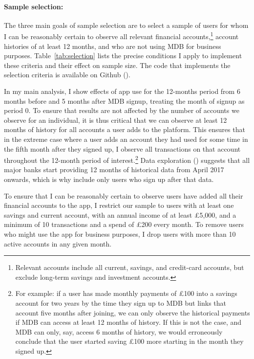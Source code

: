 \paragraph{Sample selection:}%
\label{par:sample_selection_}

The three main goals of sample selection are to select a sample of users for whom I
can be reasonably certain to observe all relevant financial
accounts,\footnote{Relevant accounts include all current, savings, and
credit-card accounts, but exclude long-term savings and investment accounts.}
account histories of at least 12 months, and who are not using MDB for business
purposes. Table~\ref{tab:selection} lists the precise conditions I apply to implement
these criteria and their effect on sample size. The code that implements the
selection criteria is available on Github
(\href{https://github.com/fabiangunzinger/mdb_eval/blob/main/src/data/selectors.py}{\faGithub}).

In my main analysis, I show effects of app use for the 12-months period from 6
months before and 5 months after MDB signup, treating the month of signup as
period 0. To ensure that results are not affected by the number of accounts we
observe for an individual, it is thus critical that we can observe at least 12
months of history for all accounts a user adds to the platform. This ensures
that in the extreme case where a user adds an account they had used for some
time in the fifth month after they signed up, I observe all transactions on
that account throughout the 12-month period of interest.\footnote{For example:
    if a user has made monthly payments of \pounds100 into a savings account
    for two years by the time they sign up to MDB but links that account five
    months after joining, we can only observe the historical payments if MDB
    can access at least 12 months of history. If this is not the case, and MDB
    can only, say, access 6 months of history, we would erroneously conclude
that the user started saving \pounds100 more starting in the month they signed
up.} Data exploration
(\href{https://github.com/fabiangunzinger/mdb_eval/blob/d04fe186bb5cca884af2b7c1c7ad429674ef701d/notebooks/available_account_history.ipynb}{\faGithub})
suggests that all major banks start providing 12 months of historical data from
April 2017 onwards, which is why include only users who sign up after that
data.

To ensure that I can be reasonably certain to observe users have added all
their financial accounts to the app, I restrict our sample to users with at
least one savings and current account, with an annual income of at least
\pounds5,000, and a minimum of 10 transactions and a spend of \pounds200 every
month. To remove users who might use the app for business purposes, I drop
users with more than 10 active accounts in any given month.

